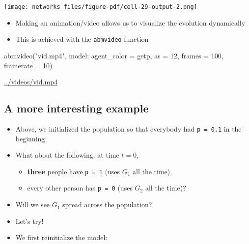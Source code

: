 \documentclass[
  letterpaper,
  DIV=11,
  numbers=noendperiod]{scrartcl}
\newenvironment{Shaded}{\begin{snugshade}}{\end{snugshade}}
\newcommand{\FloatTok}[1]{\textcolor[rgb]{0.68,0.00,0.00}{#1}}
\newcommand{\FunctionTok}[1]{\textcolor[rgb]{0.28,0.35,0.67}{#1}}
\newcommand{\NormalTok}[1]{\textcolor[rgb]{0.00,0.23,0.31}{#1}}
\newcommand{\OperatorTok}[1]{\textcolor[rgb]{0.37,0.37,0.37}{#1}}
\newcommand{\StringTok}[1]{\textcolor[rgb]{0.13,0.47,0.30}{#1}}
\providecommand{\tightlist}{%
  \setlength{\itemsep}{0pt}\setlength{\parskip}{0pt}}\usepackage{longtable,booktabs,array}
\begin{document}
\texttt{[image: networks\_files/figure-pdf/cell-29-output-2.png]}

\begin{itemize}
\tightlist
\item
  Making an animation/video allows us to visualize the evolution
  dynamically
\item
  This is achieved with the \texttt{abmvideo} function
\end{itemize}

\begin{Shaded}
\begin{Highlighting}[]
\FunctionTok{abmvideo}\NormalTok{(}\StringTok{"vid.mp4"}\NormalTok{, model; agent\_color }\OperatorTok{=}\NormalTok{ getp, as }\OperatorTok{=} \FloatTok{12}\NormalTok{, }
\NormalTok{         frames }\OperatorTok{=} \FloatTok{100}\NormalTok{, framerate }\OperatorTok{=} \FloatTok{10}\NormalTok{)}
\end{Highlighting}
\end{Shaded}

\url{../videos/vid.mp4}

\subsection{A more interesting
example}\label{a-more-interesting-example}

\begin{itemize}
\tightlist
\item
  Above, we initialized the population so that everybody had
  \texttt{p\ =\ 0.1} in the beginning
\item
  What about the following: at time \(t=0\),

  \begin{itemize}
  \tightlist
  \item
    \textbf{three} people have \texttt{p\ =\ 1} (uses \(G_1\) all the
    time),
  \item
    every other person has \texttt{p\ =\ 0} (uses \(G_2\) all the time)?
  \end{itemize}
\item
  Will we see \(G_1\) spread across the population?
\item
  Let's try!
\end{itemize}

\begin{itemize}
\tightlist
\item
  We first reinitialize the model:
\end{itemize}
\end{document}
